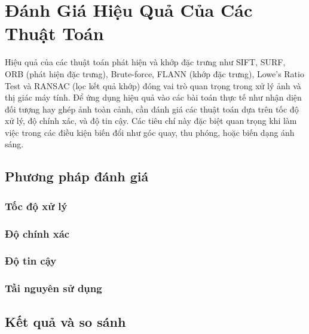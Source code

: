 \newpage
\section{Đánh Giá Hiệu Quả Của Các Thuật Toán}

Hiệu quả của các thuật toán phát hiện và khớp đặc trưng như SIFT, SURF, ORB (phát hiện đặc trưng), Brute-force, FLANN (khớp đặc trưng), Lowe's Ratio Test và RANSAC (lọc kết quả khớp) đóng vai trò quan trọng trong xử lý ảnh và thị giác máy tính. Để ứng dụng hiệu quả vào các bài toán thực tế như nhận diện đối tượng hay ghép ảnh toàn cảnh, cần đánh giá các thuật toán dựa trên tốc độ xử lý, độ chính xác, và độ tin cậy. Các tiêu chí này đặc biệt quan trọng khi làm việc trong các điều kiện biến đổi như góc quay, thu phóng, hoặc biến dạng ánh sáng.

\subsection{Phương pháp đánh giá}
\subsubsection{Tốc độ xử lý}
\subsubsection{Độ chính xác}
\subsubsection{Độ tin cậy}
\subsubsection{Tầi nguyên sử dụng}

\subsection{Kết quả và so sánh}
